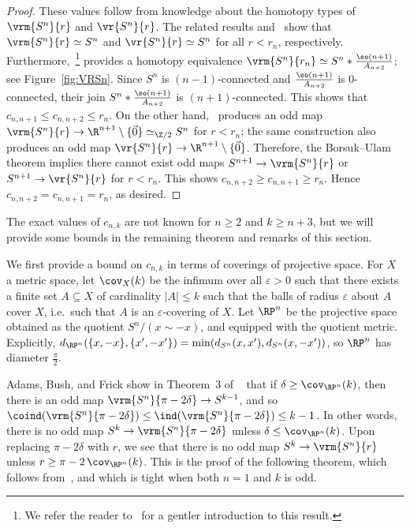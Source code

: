 \documentclass[11pt, reqno, english]{amsart}
\begin{document}
\begin{proof}
These values follow from knowledge about the homotopy types of $\vrm{S^n}{r}$ and $\vr{S^n}{r}$.
The related results
\cite[Proposition~5.3]{AAF} and~\cite[Corollary~7.1]{lim2020vietoris} show that $\vrm{S^n}{r}\simeq S^n$ and $\vr{S^n}{r}\simeq S^n$ for all $r < r_n$, respectively.
Furthermore,~\cite[Theorem~5.4]{AAF}\footnote{We refer the reader to~\cite[Section~5.1]{AdamsHeimPeterson} for a gentler introduction to this result.}
provides a homotopy equivalence $\vrm{S^n}{r_n}\simeq %
S^n * \tfrac{\so(n+1)}{A_{n+2}}$; see Figure~\ref{fig:VRSn}.
Since $S^n$ is $(n-1)$-connected and $\tfrac{\so(n+1)}{A_{n+2}}$ is 0-connected, their join $S^n * \tfrac{\so(n+1)}{A_{n+2}}$ is $(n+1)$-connected.
This shows that $c_{n,n+1} \le c_{n,n+2} \le r_n$.
On the other hand,~\cite[Proposition~5.3]{AAF} produces an odd map $\vrm{S^n}{r}\to \R^{n+1}\setminus\{\vec{0}\}\simeq_{\Z/2} S^{n}$ for $r<r_n$; the same construction also produces an odd map $\vr{S^n}{r}\to \R^{n+1}\setminus\{\vec{0}\}$.
Therefore, the Borsuk--Ulam theorem implies there cannot exist odd maps $S^{n+1}\to\vrm{S^n}{r}$ or $S^{n+1}\to\vr{S^n}{r}$ for $r<r_n$.
This shows $c_{n,n+2} \ge c_{n,n+1}\ge r_n$.
Hence $c_{n,n+2}=c_{n,n+1}= r_n$, as desired.
\end{proof}

The exact values of $c_{n,k}$ are not known for $n\ge 2$ and $k\ge n+3$, but we will provide some bounds in the remaining theorem and remarks of this section.

We first provide a bound on $c_{n,k}$ in terms of coverings of projective space.
For $X$ a metric space, let $\cov_X(k)$ be the infimum over all $\varepsilon>0$ such that there exists a finite set $A \subseteq X$ of cardinality $|A| \le k$ such that the balls of radius $\varepsilon$ about $A$ cover $X$, i.e.\ such that $A$ is an $\varepsilon$-covering of $X$.
Let $\RP^n$ be the projective space obtained as the quotient $S^n/(x \sim -x)$, and equipped with the quotient metric.
Explicitly, $d_{\RP^n}(\{x,-x\},\{x',-x'\})=\min(d_{S^n}(x,x'),d_{S^n}(x,-x'))$, so $\RP^n$ has diameter $\tfrac{\pi}{2}$.

Adams, Bush, and Frick show in Theorem~3 of ~\cite{ABF2} that if $\delta \ge \cov_{\RP^n}(k)$, then there is an odd map $\vrm{S^n}{\pi-2\delta} \to S^{k-1}$, and so $\coind(\vrm{S^n}{\pi-2\delta}) \le \ind(\vrm{S^n}{\pi-2\delta}) \le k-1$.
In other words, there is no odd map $S^k \to \vrm{S^n}{\pi-2\delta}$ unless $\delta \le \cov_{\RP^n}(k)$.
Upon replacing $\pi-2\delta$ with $r$, we see that there is no odd map $S^k \to \vrm{S^n}{r}$ unless $r \ge \pi-2\,\cov_{\RP^n}(k)$.
This is the proof of the following theorem, which follows from~\cite[Theorem~3]{ABF2}, and which is tight when both $n=1$ and $k$ is odd.
\end{document}
